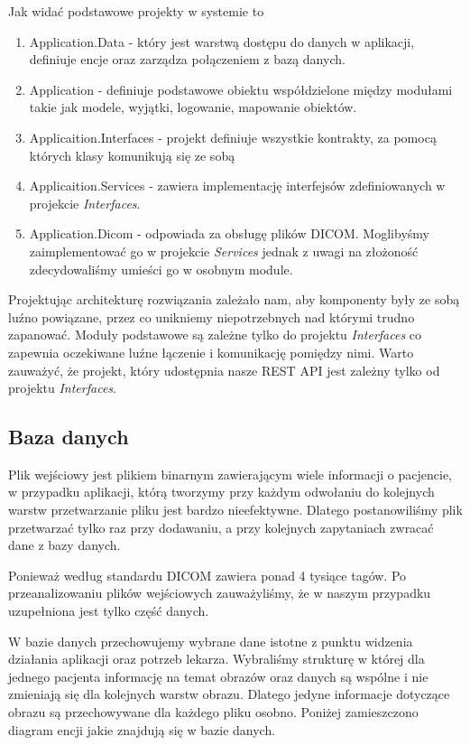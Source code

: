 \documentclass[a4paper,11pt,twoside]{report}
\theoremstyle{definition}
\begin{document}
Jak widać podstawowe projekty w systemie to
\begin{enumerate}
\item Application.Data - który jest warstwą dostępu do danych w aplikacji, definiuje encje oraz zarządza połączeniem z bazą danych.
\item Application - definiuje podstawowe obiektu współdzielone między modułami takie jak modele, wyjątki, logowanie, mapowanie obiektów.
\item Applicaition.Interfaces - projekt definiuje wszystkie kontrakty, za pomocą których klasy komunikują się ze sobą
\item Applicaition.Services - zawiera implementację interfejsów zdefiniowanych w projekcie \textit{Interfaces}.
\item Application.Dicom - odpowiada za obsługę plików DICOM. Moglibyśmy zaimplementować go w projekcie \textit{Services} jednak z uwagi na złożoność zdecydowaliśmy umieści go w osobnym module.
\end{enumerate}

Projektując architekturę rozwiązania zależało nam, aby komponenty były ze sobą luźno powiązane, przez co unikniemy niepotrzebnych nad którymi trudno zapanować. Moduły podstawowe są zależne tylko do projektu \textit{Interfaces} co zapewnia oczekiwane luźne łączenie i komunikację pomiędzy nimi. Warto zauważyć, że projekt, który udostępnia nasze REST API jest zależny tylko od projektu \textit{Interfaces}.

\subsection{Baza danych}

Plik wejściowy jest plikiem binarnym zawierającym wiele informacji o pacjencie, w przypadku aplikacji, którą tworzymy przy każdym odwołaniu do kolejnych warstw przetwarzanie pliku jest bardzo nieefektywne. Dlatego postanowiliśmy plik przetwarzać tylko raz przy dodawaniu, a przy kolejnych zapytaniach zwracać dane z bazy danych.
\par
Ponieważ według standardu DICOM \cite{standardDICOM} zawiera ponad 4 tysiące tagów. Po przeanalizowaniu plików wejściowych zauważyliśmy, że w naszym przypadku uzupełniona jest tylko część danych. 
\par
W bazie danych przechowujemy wybrane dane istotne z punktu widzenia działania aplikacji oraz potrzeb lekarza. Wybraliśmy strukturę w której dla jednego pacjenta informację na temat obrazów oraz danych są wspólne i nie zmieniają się dla kolejnych warstw obrazu. Dlatego jedyne informacje dotyczące obrazu są przechowywane dla każdego pliku osobno. Poniżej zamieszczono diagram encji jakie znajdują się w bazie danych.
\end{document}
